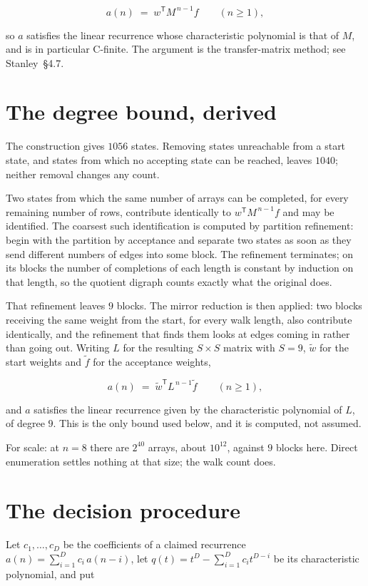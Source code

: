 \documentclass[11pt]{article}
\theoremstyle{definition}
\begin{document}
\[a(n) \;=\; w^{\mathsf T} M^{\,n-1} f \qquad (n \ge 1),\]

so $a$ satisfies the linear recurrence whose characteristic polynomial is that of $M$, and is in particular C-finite. The argument is the transfer-matrix method; see Stanley~\S4.7.

\section{The degree bound, derived}

The construction gives $1056$ states. Removing states unreachable from a start state, and states from which no accepting state can be reached, leaves $1040$; neither removal changes any count.

Two states from which the same number of arrays can be completed, for every remaining number of rows, contribute identically to $w^{\mathsf T}M^{\,n-1}f$ and may be identified. The coarsest such identification is computed by partition refinement: begin with the partition by acceptance and separate two states as soon as they send different numbers of edges into some block. The refinement terminates; on its blocks the number of completions of each length is constant by induction on that length, so the quotient digraph counts exactly what the original does.

That refinement leaves $9$ blocks. The mirror reduction is then applied: two blocks receiving the same weight from the start, for every walk length, also contribute identically, and the refinement that finds them looks at edges coming in rather than going out. Writing $L$ for the resulting $S \times S$ matrix with $S = 9$, $\tilde w$ for the start weights and $\tilde f$ for the acceptance weights,

\[a(n) \;=\; \tilde w^{\mathsf T} L^{\,n-1} \tilde f \qquad (n \ge 1),\]

and $a$ satisfies the linear recurrence given by the characteristic polynomial of $L$, of degree $9$. This is the only bound used below, and it is computed, not assumed.

For scale: at $n = 8$ there are $2^{40}$ arrays, about $10^{12}$, against $9$ blocks here. Direct enumeration settles nothing at that size; the walk count does.

\section{The decision procedure}

Let $c_1,\dots,c_D$ be the coefficients of a claimed recurrence $a(n) = \sum_{i=1}^{D} c_i\,a(n-i)$, let $q(t) = t^{D} - \sum_{i=1}^{D} c_i t^{D-i}$ be its characteristic polynomial, and put
\end{document}
